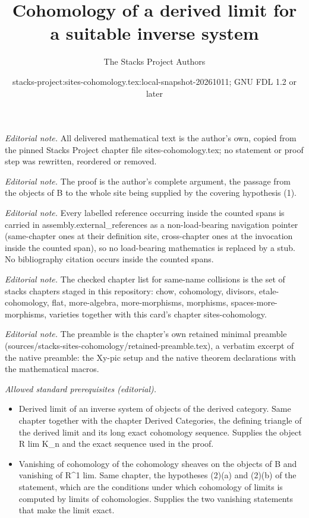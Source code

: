 \documentclass[10pt,a4paper]{amsart}
\title{Cohomology of a derived limit for a suitable inverse system}
\author{The Stacks Project Authors}
\date{stacks-project:sites-cohomology.tex:local-snapshot-20261011; GNU FDL 1.2 or later}
\theoremstyle{plain}
\theoremstyle{definition}
\theoremstyle{remark}
\numberwithin{equation}{subsection}
\begin{document}
\maketitle
\noindent\textit{Editorial note.} All delivered mathematical text is the author's own, copied from the pinned Stacks Project chapter file sites-cohomology.tex; no statement or proof step was rewritten, reordered or removed.\par\medskip
\noindent\textit{Editorial note.} The proof is the author's complete argument, the passage from the objects of B to the whole site being supplied by the covering hypothesis (1).\par\medskip
\noindent\textit{Editorial note.} Every labelled reference occurring inside the counted spans is carried in assembly.external\_references as a non-load-bearing navigation pointer (same-chapter ones at their definition site, cross-chapter ones at the invocation inside the counted span), so no load-bearing mathematics is replaced by a stub. No bibliography citation occurs inside the counted spans.\par\medskip
\noindent\textit{Editorial note.} The checked chapter list for same-name collisions is the set of stacks chapters staged in this repository: chow, cohomology, divisors, etale-cohomology, flat, more-algebra, more-morphisms, morphisms, spaces-more-morphisms, varieties together with this card's chapter sites-cohomology.\par\medskip
\noindent\textit{Editorial note.} The preamble is the chapter's own retained minimal preamble (sources/stacks-sites-cohomology/retained-preamble.tex), a verbatim excerpt of the native preamble: the Xy-pic setup and the native theorem declarations with the mathematical macros.\par\medskip
\noindent\textit{Allowed standard prerequisites (editorial).}\begin{itemize}
\item Derived limit of an inverse system of objects of the derived category. Same chapter together with the chapter Derived Categories, the defining triangle of the derived limit and its long exact cohomology sequence. Supplies the object R lim K\_n and the exact sequence used in the proof.
\item Vanishing of cohomology of the cohomology sheaves on the objects of B and vanishing of R\textasciicircum{}1 lim. Same chapter, the hypotheses (2)(a) and (2)(b) of the statement, which are the conditions under which cohomology of limits is computed by limits of cohomologies. Supplies the two vanishing statements that make the limit exact.
\end{itemize}\medskip
\end{document}
